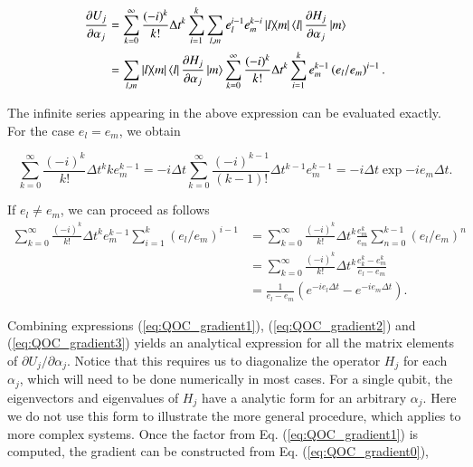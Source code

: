 \begin{align}
    \frac{\partial U_j}{\partial \alpha_j} & = \sum\limits_{k=0}^\infty \frac{(-i)^k}{k!}\Delta t^k \sum\limits_{i=1}^k \sum\limits_{l,m} e_l^{i-1}e_m^{k-i} \ketbra{l}{m} \bra{l}\frac{\partial H_j}{\partial \alpha_j}\ket{m} \nonumber \\
    & = \sum\limits_{l,m} \ketbra{l}{m} \bra{l}\frac{\partial H_j}{\partial \alpha_j}\ket{m} \sum\limits_{k=0}^\infty \frac{(-i)^k}{k!}\Delta t^k \sum\limits_{i=1}^k e_m^{k-1} \left(e_l/e_m\right)^{i-1}.
    \label{eq:QOC_gradient1}
\end{align}

The infinite series appearing in the above expression can be evaluated exactly. For the case $e_l = e_m$, we obtain

\begin{equation}
    \sum\limits_{k=0}^\infty \frac{(-i)^k}{k!}\Delta t^k k e_m^{k-1} = -i\Delta t \sum\limits_{k=0}^\infty \frac{(-i)^{k-1}}{(k-1)!}\Delta t^{k-1} e_m^{k-1}=-i\Delta t \exp{-i e_m \Delta t}.
    \label{eq:QOC_gradient2}
\end{equation}

If $e_l\neq e_m$, we can proceed as follows
\begin{align}
    \sum\limits_{k=0}^\infty \frac{(-i)^k}{k!}\Delta t^k e_m^{k-1}\sum\limits_{i=1}^k \left(e_l/e_m\right)^{i-1} & = \sum\limits_{k=0}^\infty \frac{(-i)^k}{k!}\Delta t^k \frac{e_m^k}{e_m}\sum\limits_{n=0}^{k-1} \left(e_l/e_m\right)^{n} \nonumber \\
    & = \sum\limits_{k=0}^\infty \frac{(-i)^k}{k!}\Delta t^k \frac{e_k^k - e_m^k}{e_l-e_m} \nonumber \\
    & = \frac{1}{e_l-e_m}\left(e^{-i e_l \Delta t}-e^{-i e_m \Delta t}\right).
    \label{eq:QOC_gradient3}
\end{align}

Combining expressions (\ref{eq:QOC_gradient1}), (\ref{eq:QOC_gradient2}) and (\ref{eq:QOC_gradient3}) yields an analytical expression for all the matrix elements of $\partial U_j/\partial \alpha_j$. Notice that this requires us to diagonalize the operator $H_j$ for each $\alpha_j$, which will need to be done numerically in most cases. For a single qubit, the eigenvectors and eigenvalues of $H_j$ have a analytic form for an arbitrary $\alpha_j$. Here we do not use this form to illustrate the more general procedure, which applies to more complex systems. Once the factor from Eq. (\ref{eq:QOC_gradient1}) is computed, the gradient can be constructed from Eq. (\ref{eq:QOC_gradient0}),

